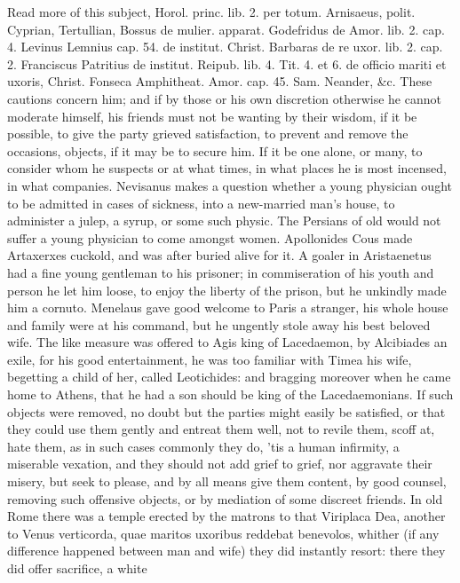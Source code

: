 {Read more of this subject, Horol. princ. lib. 2. per totum. Arnisaeus,
polit. Cyprian, Tertullian, Bossus de mulier. apparat. Godefridus de
Amor. lib. 2. cap. 4. Levinus Lemnius cap. 54. de institut. Christ.
Barbaras de re uxor. lib. 2. cap. 2. Franciscus Patritius de institut.
Reipub. lib. 4. Tit. 4. et 6. de officio mariti et uxoris, Christ.
Fonseca Amphitheat. Amor. cap. 45. Sam. Neander, \&c.
These cautions concern him; and if by those or his own discretion
otherwise he cannot moderate himself, his friends must not be wanting
by their wisdom, if it be possible, to give the party grieved
satisfaction, to prevent and remove the occasions, objects, if it may
be to secure him. If it be one alone, or many, to consider whom he
suspects or at what times, in what places he is most incensed, in what
companies. Nevisanus makes a question whether a young physician
ought to be admitted in cases of sickness, into a new-married man's
house, to administer a julep, a syrup, or some such physic. The
Persians of old would not suffer a young physician to come amongst
women. Apollonides Cous made Artaxerxes cuckold, and was after
buried alive for it. A goaler in Aristaenetus had a fine young
gentleman to his prisoner; in commiseration of his youth and
person he let him loose, to enjoy the liberty of the prison, but he
unkindly made him a cornuto. Menelaus gave good welcome to Paris a
stranger, his whole house and family were at his command, but he
ungently stole away his best beloved wife. The like measure was offered
to Agis king of Lacedaemon, by  Alcibiades an exile, for his good
entertainment, he was too familiar with Timea his wife, begetting a
child of her, called Leotichides: and bragging moreover when he came
home to Athens, that he had a son should be king of the Lacedaemonians.
If such objects were removed, no doubt but the parties might easily be
satisfied, or that they could use them gently and entreat them well,
not to revile them, scoff at, hate them, as in such cases commonly they
do, 'tis a human infirmity, a miserable vexation, and they should not
add grief to grief, nor aggravate their misery, but seek to please, and
by all means give them content, by good counsel, removing such
offensive objects, or by mediation of some discreet friends. In old
Rome there was a temple erected by the matrons to that Viriplaca
Dea, another to Venus verticorda, quae maritos uxoribus reddebat
benevolos, whither (if any difference happened between man and wife)
they did instantly resort: there they did offer sacrifice, a white
}
